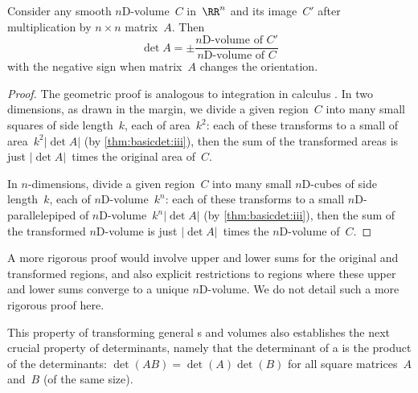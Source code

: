 \begin{theorem} \label{thm:detanyC} 
Consider any  smooth $n$D-volume~\(C\) in~\(\RR^n\) and its image~\(C'\) after multiplication by \(n\times n\) matrix~\(A\).
Then
\begin{equation*}
\det A=\pm\frac{\text{$n$D-volume of }C'}
{\text{$n$D-volume of }C}
\end{equation*}
with the negative sign when matrix~\(A\) changes the orientation.
\end{theorem}
\begin{proof} 
The geometric proof is analogous to integration in calculus \cite[p.402]{Hannah96}. 
In two dimensions, as drawn in the margin,  we divide a given region~\(C\) into  many small squares of side length~\(k\), each of area~\(k^2\):  each of these transforms to a small  of area~\(k^2|\det A|\) (by \autoref{thm:basicdet:iii}), then the sum of the transformed areas is just \(|\det A|\)~times the  original area of~\(C\).

In  \(n\)-dimensions, divide a given region~\(C\) into  many small $n$D-cubes of side length~\(k\), each of $n$D-volume~\(k^n\):  each of these transforms to a small $n$D-parallelepiped of $n$D-volume~\(k^n|\det A|\) (by \autoref{thm:basicdet:iii}), then the sum of the transformed $n$D-volume is just \(|\det A|\)~times the  $n$D-volume of~\(C\). 
\end{proof}

A more rigorous proof would involve upper and lower sums for the original and transformed regions, and also explicit restrictions to regions where these upper and lower sums converge to a unique $n$D-volume. 
We do not detail such a more rigorous proof here.


This property of transforming general s and volumes also establishes the next crucial property of determinants, namely that the determinant of a  is the product of the determinants: \(\det(AB)=\det(A)\det(B)\) for all square matrices~\(A\) and~\(B\) (of the same size).

